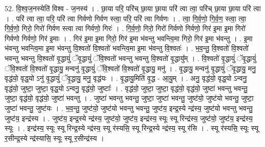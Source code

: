 \documentclass[17pt]{extarticle}
\begin{document}
52. वि॒श्व॒ज॒नस्येति॑ विश्व - ज॒नस्य॑ । . छा॒या परि॒ परि॑च् छा॒या छा॒या परि॑ त्वा त्वा॒ परि॑च् छा॒या छा॒या परि॑ त्वा । . परि॑ त्वा त्वा॒ परि॒ परि॑ त्वा गिर्वणो गिर्वण स्त्वा॒ परि॒ परि॑ त्वा गिर्वणः । . त्वा॒ गि॒र्व॒णो॒ गि॒र्व॒ण॒ स्त्वा॒ त्वा॒ गि॒र्व॒णो॒ गिरो॒ गिरो॑ गिर्वण स्त्वा त्वा गिर्वणो॒ गिरः॑ । . गि॒र्व॒णो॒ गिरो॒ गिरो॑ गिर्वणो गिर्वणो॒ गिर॑ इ॒मा इ॒मा गिरो॑ गिर्वणो गिर्वणो॒ गिर॑ इ॒माः । . गिर॑ इ॒मा इ॒मा गिरो॒ गिर॑ इ॒मा भ॑वन्तु भवन्त्वि॒मा गिरो॒ गिर॑ इ॒मा भ॑वन्तु । . इ॒मा भ॑वन्तु भवन्त्वि॒मा इ॒मा भ॑वन्तु वि॒श्वतो॑ वि॒श्वतो॑ भवन्त्वि॒मा इ॒मा भ॑वन्तु वि॒श्वतः॑ । . भ॒व॒न्तु॒ वि॒श्वतो॑ वि॒श्वतो॑ भवन्तु भवन्तु वि॒श्वतो॑ वृ॒द्धायुं॑ ॅवृ॒द्धायुं॑ ॅवि॒श्वतो॑ भवन्तु भवन्तु वि॒श्वतो॑ वृ॒द्धायु᳚म् । . वि॒श्वतो॑ वृ॒द्धायुं॑ ॅवृ॒द्धायुं॑ ॅवि॒श्वतो॑ वि॒श्वतो॑ वृ॒द्धायु॒ मन्वनु॑ वृ॒द्धायुं॑ ॅवि॒श्वतो॑ वि॒श्वतो॑ वृ॒द्धायु॒ मनु॑ । . वृ॒द्धायु॒ मन्वनु॑ वृ॒द्धायुं॑ ॅवृ॒द्धायु॒ मनु॒ वृद्ध॑यो॒ वृद्ध॒यो ऽनु॑ वृ॒द्धायुं॑ ॅवृ॒द्धायु॒ मनु॒ वृद्ध॑यः । . वृ॒द्धायु॒मिति॑ वृ॒द्ध - आ॒यु॒म् । . अनु॒ वृद्ध॑यो॒ वृद्ध॒यो ऽन्वनु॒ वृद्ध॑यो॒ जुष्टा॒ जुष्टा॒ वृद्ध॒यो ऽन्वनु॒ वृद्ध॑यो॒ जुष्टाः᳚ । . वृद्ध॑यो॒ जुष्टा॒ जुष्टा॒ वृद्ध॑यो॒ वृद्ध॑यो॒ जुष्टा॑ भवन्तु भवन्तु॒ जुष्टा॒ वृद्ध॑यो॒ वृद्ध॑यो॒ जुष्टा॑ भवन्तु । . जुष्टा॑ भवन्तु भवन्तु॒ जुष्टा॒ जुष्टा॑ भवन्तु॒ जुष्ट॑यो॒ जुष्ट॑यो भवन्तु॒ जुष्टा॒ जुष्टा॑ भवन्तु॒ जुष्ट॑यः । . भ॒व॒न्तु॒ जुष्ट॑यो॒ जुष्ट॑यो भवन्तु भवन्तु॒ जुष्ट॑य॒ इन्द्र॒स्ये न्द्र॑स्य॒ जुष्ट॑यो भवन्तु भवन्तु॒ जुष्ट॑य॒ इन्द्र॑स्य । . जुष्ट॑य॒ इन्द्र॒स्ये न्द्र॑स्य॒ जुष्ट॑यो॒ जुष्ट॑य॒ इन्द्र॑स्य॒ स्यूः स्यू रिन्द्र॑स्य॒ जुष्ट॑यो॒ जुष्ट॑य॒ इन्द्र॑स्य॒ स्यूः । . इन्द्र॑स्य॒ स्यूः स्यू रिन्द्र॒स्ये न्द्र॑स्य॒ स्यू र॑स्यसि॒ स्यू रिन्द्र॒स्ये न्द्र॑स्य॒ स्यू र॑सि । . स्यू र॑स्यसि॒ स्यूः स्यू र॒सीन्द्र॒स्ये न्द्र॑स्यासि॒ स्यूः स्यू र॒सीन्द्र॑स्य । \newline
\end{document}
